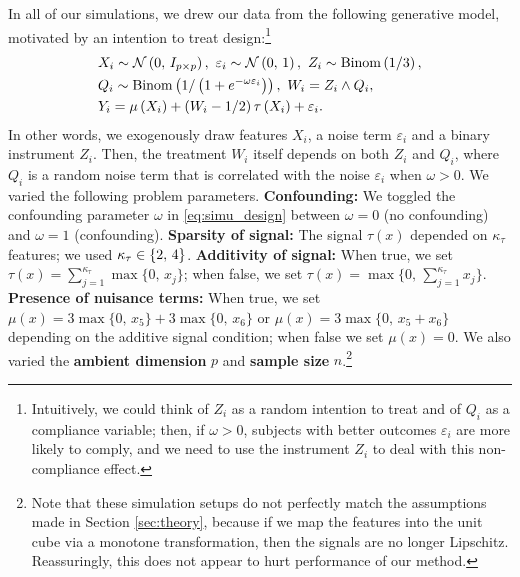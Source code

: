 \documentclass[aos]{imsart}
\theoremstyle{plain}
\theoremstyle{definition}
\theoremstyle{remark}
\begin{document}
\begin{CJK}{UTF8}{gbsn}
\begin{appendix}
In all of our simulations, we drew our data from the following generative model, motivated
by an intention to treat design:\footnote{Intuitively, we could think of $Z_i$ as a random intention
to treat and of $Q_i$ as a compliance variable; then, if $\omega > 0$, subjects with better
outcomes $\varepsilon_i$ are more likely to comply, and we need to use the instrument $Z_i$
to deal with this non-compliance effect.}
\begin{equation}
\label{eq:simu_design}
\begin{split}
&X_i \sim \nn\p{0, \, I_{p \times p}}, \ \varepsilon_i \sim \nn\p{0, \, 1}, \
Z_i \sim \operatorname{Binom}\p{1/3}, \\
&Q_i \sim \operatorname{Binom}\p{1/\p{1 + e^{- \omega \varepsilon_i}}}, \
W_i = Z_i \land Q_i, \\
&Y_i = \mu\p{X_i} + \p{W_i - 1/2} \tau\p{X_i} + \varepsilon_i.
\end{split}
\end{equation}
In other words, we exogenously draw features $X_i$, a noise term $\varepsilon_i$ and a
binary instrument $Z_i$. Then, the treatment $W_i$ itself depends on both $Z_i$ and $Q_i$,
where $Q_i$ is a random noise term that is correlated with the noise $\varepsilon_i$ when
$\omega > 0$.
We varied the following problem parameters.
{\bf Confounding:} We toggled the confounding parameter $\omega$
in \eqref{eq:simu_design} between $\omega = 0$ (no confounding) and $\omega = 1$
(confounding). {\bf Sparsity of signal:} The signal $\tau(x)$ depended on $\kappa_\tau$
features; we used $\kappa_\tau \in \left\{2, \, 4\right\}$. {\bf Additivity of signal:} When true, we set
$\tau(x) = \sum_{j = 1}^{\kappa_\tau} \max\{0, \, x_j\}$; when false, we set
$\tau(x) = \max\{0, \, \sum_{j = 1}^{\kappa_\tau} x_j\}$.
{\bf Presence of nuisance terms:} When true, we set
$\mu(x) = 3\max\{0, \, x_5\} + 3\max\{0, \, x_6\}$ or
$\mu(x) = 3\max\{0, \, x_5 + x_6\}$ depending on
the additive signal condition; when false we set $\mu(x) = 0$.
We also varied the {\bf ambient dimension} $p$ and {\bf sample size}
$n$.\footnote{Note that these simulation setups do not perfectly match the assumptions
made in Section \ref{sec:theory}, because if we map the features into the unit cube
via a monotone transformation, then the signals are no longer Lipschitz. Reassuringly, this
does not appear to hurt performance of our method.}


\end{appendix}
\end{CJK}
\end{document}
